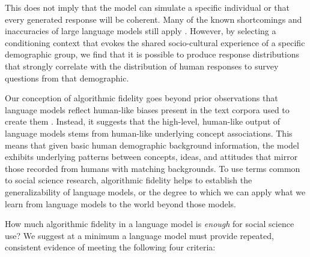 \documentclass[11pt]{article}
\begin{document}
This does not imply that the model can simulate a specific individual or that every generated response will be coherent. Many of the known shortcomings and inaccuracies of large language models still apply \citep{bender2021dangers, marcus2020next}. However, by selecting a conditioning context that evokes the shared socio-cultural experience of a specific demographic group, we find that it is possible to produce response distributions that strongly correlate with the distribution of human responses to survey questions from that demographic.

Our conception of algorithmic fidelity goes beyond prior observations that language models reflect human-like biases present in the text corpora used to create them \citep{garg2018word, caliskan2017semantics, panchArtificialIntelligenceAlgorithmic2019, maysonBiasBiasOut2018, barocasBigDataDisparate2016}. Instead, it suggests that the high-level, human-like output of language models stems from human-like underlying concept associations. This means that given basic human demographic background information, the model exhibits underlying patterns between concepts, ideas, and attitudes that mirror those recorded from humans with matching backgrounds. To use terms common to social science research, algorithmic fidelity helps to establish the generalizability of language models, or the degree to which we can apply what we learn from language models to the world beyond those models. %


How much algorithmic fidelity in a language model is \textit{enough} for social science use? We suggest at a minimum a language model must provide repeated, consistent evidence of meeting the following four criteria:

\end{document}
